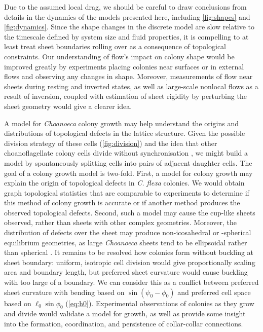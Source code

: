 Due to the assumed local drag, we should be careful to draw conclusions from details in the dynamics of the models presented here, including \cref{fig:shapes} and \cref{fig:dynamics}.
Since the shape changes in the discrete model are slow relative to the timescale defined by system size and fluid properties, it is compelling to at least treat sheet boundaries rolling over as a consequence of topological constraints.
Our understanding of flow's impact on colony shape would be improved greatly by experiments placing colonies near surfaces or in external flows and observing any changes in shape.
Moreover, measurements of flow near sheets during resting and inverted states, as well as large-scale nonlocal flows as a result of inversion, coupled with estimation of sheet rigidity by perturbing the sheet geometry would give a clearer idea.

A model for \textit{Choanoeca} colony growth may help understand the origins and distributions of topological defects in the lattice structure. 
Given the possible division strategy of these cells (\cref{fig:division}) and the idea that other choanoflagellate colony cells divide without synchronisation \citep{larson2020}, we might build a model by spontaneously splitting cells into pairs of adjacent daughter cells.
The goal of a colony growth model is two-fold.
First, a model for colony growth may explain the origin of topological defects in \textit{C. flexa} colonies.
We would obtain graph topological statistics that are comparable to experiments to determine if this method of colony growth is accurate or if another method produces the observed topological defects.
Second, such a model may cause the cup-like sheets observed, rather than sheets with other complex geometries.
Moreover, the distribution of defects over the sheet may produce non-icosahedral or -spherical equilibrium geometries, as large \textit{Choanoeca} sheets tend to be ellipsoidal rather than spherical \citep{leadbeater1983,brunet2019}.
It remains to be resolved how colonies form without buckling at sheet boundary: uniform, isotropic cell division would give proportionally scaling area and boundary length, but preferred sheet curvature would cause buckling with too large of a boundary.
We can consider this as a conflict between preferred sheet curvature with bending based on $\sin (\psi_0 - \phi_0)$ and preferred cell space based on $\ell_0 \sin \phi_0$ (\cref{eq:h0}).
Experimental observations of colonies as they grow and divide would validate a model for growth, as well as provide some insight into the formation, coordination, and persistence of collar-collar connections.

